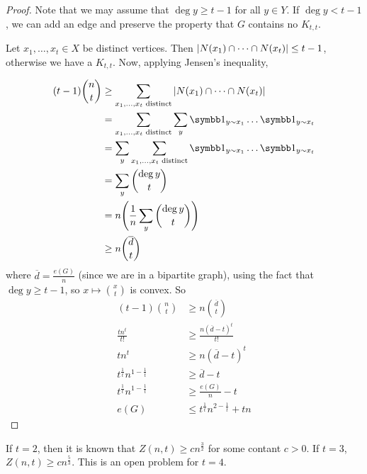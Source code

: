 \begin{proof}
	Note that we may assume that \( \deg y \geq t - 1 \) for all \( y \in Y \).
	If \( \deg y < t - 1 \), we can add an edge and preserve the property that \( G \) contains no \( K_{t,t} \).

	Let \( x_1, \dots, x_t \in X \) be distinct vertices.
	Then \( \abs{N(x_1) \cap \dots \cap N(x_t)} \leq t - 1 \), otherwise we have a \( K_{t,t} \).
	Now, applying Jensen's inequality,
	
	\begin{align*}
		(t-1) \binom n t &\geq \sum_{x_1, \dots, x_t \text{ distinct}} \abs{N(x_1) \cap \dots \cap N(x_t)} \\
		&= \sum_{x_1, \dots, x_t \text{ distinct}} \sum_y \symbb 1_{y \sim x_1} \dots \symbb 1_{y \sim x_t} \\
		&= \sum_y \sum_{x_1, \dots, x_t \text{ distinct}} \symbb 1_{y \sim x_1} \dots \symbb 1_{y \sim x_t} \\
		&= \sum_y \binom{\deg y}{t} \\
		&= n \qty( \frac{1}{n} \sum_y \binom{\deg y}{t} ) \\
		&\geq n \binom{\overline d}{t}
	\end{align*}
	where \( \overline d = \frac{e(G)}{n} \) (since we are in a bipartite graph), using the fact that \( \deg y \geq t - 1 \), so \( x \mapsto \binom x t \) is convex.
	So
	\begin{align*}
		(t-1) \binom n t &\geq n \binom{\overline d}{t} \\
		\frac{tn^t}{t!} &\geq \frac{n(\overline d - t)^t}{t!} \\
		tn^t &\geq n(\overline d - t)^t \\
		t^{\frac{1}{t}} n^{1 - \frac{1}{t}} &\geq \overline d - t \\
		t^{\frac{1}{t}} n^{1 - \frac{1}{t}} &\geq \frac{e(G)}{n} - t \\
		e(G) &\leq t^{\frac{1}{t}} n^{2 - \frac{1}{t}} + tn
	\end{align*}
\end{proof}
\begin{remark}
	If \( t = 2 \), then it is known that \( Z(n,t) \geq cn^{\frac{3}{2}} \) for some contant \( c > 0 \).
	If \( t = 3 \), \( Z(n,t) \geq cn^{\frac{5}{3}} \).
	This is an open problem for \( t = 4 \).
\end{remark}


